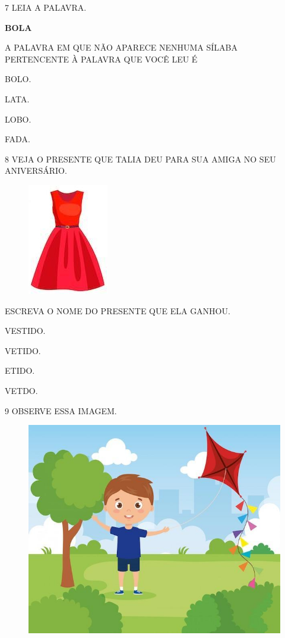 \num{7} LEIA A PALAVRA.

\begin{myquote}
\textbf{BOLA}
\end{myquote}

A PALAVRA EM QUE NÃO APARECE NENHUMA SÍLABA PERTENCENTE À PALAVRA QUE VOCÊ LEU É 

\begin{escolha}
\item BOLO.

\item LATA.

\item LOBO.

\item FADA.
\end{escolha}

\pagebreak
\num{8} VEJA O PRESENTE QUE TALIA DEU PARA SUA AMIGA NO SEU ANIVERSÁRIO.

\begin{figure}[htpb]
\centering
\includegraphics[width=.25\textwidth]{media/image232.jpg}
\end{figure}

ESCREVA O NOME DO PRESENTE QUE ELA GANHOU.

\begin{escolha}
\item VESTIDO.

\item VETIDO.

\item ETIDO.

\item VETDO.
\end{escolha}

\num{9} OBSERVE ESSA IMAGEM.

\begin{figure}[htpb]
\centering
\includegraphics[width=.55\textwidth]{media/image233.jpg}
\end{figure}

